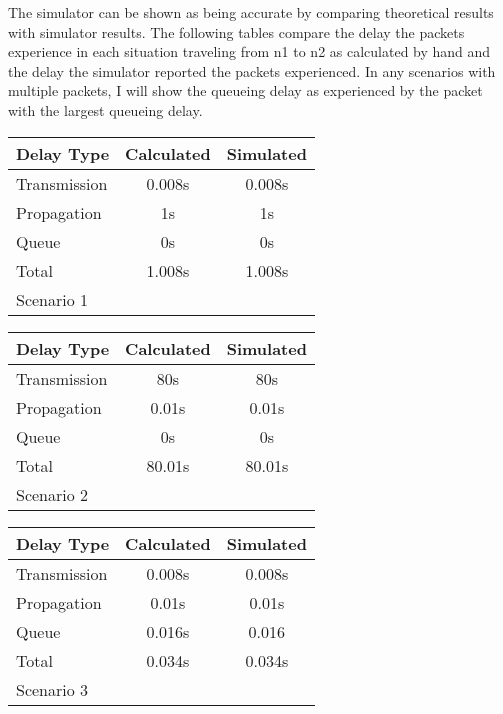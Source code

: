 \documentclass[11pt]{article}
\begin{document}
The simulator can be shown as being accurate by comparing theoretical results with simulator results. The following tables compare the delay the packets experience in each situation traveling from n1 to n2 as calculated by hand and the delay the simulator reported the packets experienced. In any scenarios with multiple packets, I will show the queueing delay as experienced by the packet with the largest queueing delay.

\vspace{0.5cm}
\begin{absolutelynopagebreak}
\begin{tabular}{lcc}
  \toprule
  Delay Type & Calculated & Simulated\\
  \midrule
  Transmission & 0.008s & 0.008s\\
  Propagation & 1s & 1s\\
  Queue & 0s & 0s\\
  Total & 1.008s & 1.008s\\
  \bottomrule
  Scenario 1
\end{tabular}
\end{absolutelynopagebreak}
\vspace{0.5cm}

\begin{absolutelynopagebreak}
\begin{tabular}{lcc}
  \toprule
  Delay Type & Calculated & Simulated\\
  \midrule
  Transmission & 80s & 80s\\
  Propagation & 0.01s & 0.01s\\
  Queue & 0s & 0s\\
  Total & 80.01s & 80.01s\\
  \bottomrule
  Scenario 2
\end{tabular}
\end{absolutelynopagebreak}
\vspace{0.5cm}

\begin{absolutelynopagebreak}
\begin{tabular}{lcc}
  \toprule
  Delay Type & Calculated & Simulated\\
  \midrule
  Transmission & 0.008s & 0.008s\\
  Propagation & 0.01s & 0.01s\\
  Queue & 0.016s & 0.016\\
  Total & 0.034s & 0.034s\\
  \bottomrule
  Scenario 3
\end{tabular}
\end{absolutelynopagebreak}
\vspace{0.5cm}
\end{document}
